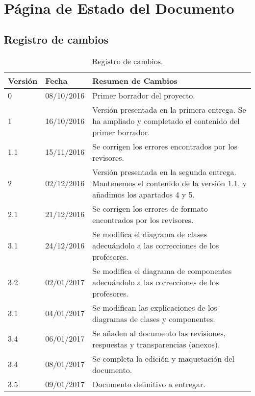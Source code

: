 \section*{Página de Estado del Documento}

\subsection*{Registro de cambios}
\begin{table}[htbp]
\begin{center}
\begin{tabular}{l l p{11cm} }
\textbf{Versión}&\textbf{Fecha}&\textbf{Resumen de Cambios}\\
\hline \hline
0&08/10/2016&Primer borrador del proyecto.\\
\hline
1&16/10/2016&Versión presentada en la primera entrega. Se ha ampliado y completado el contenido del primer
borrador.\\
\hline
1.1&15/11/2016&Se corrigen los errores encontrados por los revisores.\\
\hline
2&02/12/2016&Versión presentada en la segunda entrega. Mantenemos el contenido de la versión 1.1, y
añadimos los apartados 4 y 5.\\
\hline
2.1&21/12/2016&Se corrigen los errores de formato encontrados por los revisores.\\
\hline
3.1&24/12/2016&Se modifica el diagrama de clases\index{clase} adecuándolo a las correcciones de los profesores.\\
\hline
3.2&02/01/2017&Se modifica el diagrama de componentes\index{componente} adecuándolo a las correcciones de los profesores.\\
\hline
3.1&04/01/2017&Se modifican las explicaciones de los diagramas de clases\index{clase} y componentes\index{componente}.\\
\hline
3.4&06/01/2017&Se añaden al documento las revisiones, respuestas y transparencias (anexos).\\
\hline
3.4&08/01/2017&Se completa la edición y maquetación del documento.\\
\hline
3.5&09/01/2017&Documento definitivo a entregar.\\
\hline
\end{tabular}
\caption{Registro de cambios.}
\label{tabla:changeReg}
\end{center}
\end{table}